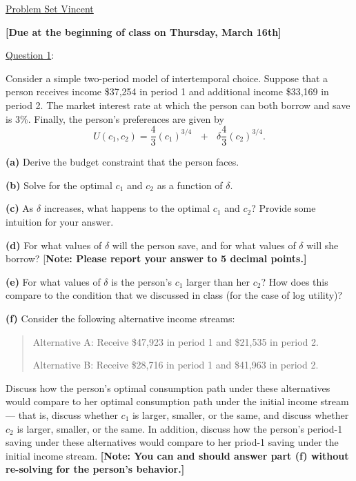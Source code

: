 \documentclass[12pt]{article}
\theoremstyle{definition}
\begin{document}
	
	
	\begin{center}
		\underline{{\Large Problem Set Vincent}}
		
		\textbf{[Due at the beginning of class on Thursday, March 16th]}
	\end{center}
\bigskip

\underline{Question 1}:

Consider a simple two-period model of intertemporal choice. Suppose that a
person receives income \$37,254 in period 1 and additional income \$33,169
in period 2. The market interest rate at which the person can both borrow
and save is 3\%. Finally, the person's preferences are given by 
\[
U(c_{1},c_{2})=\frac{4}{3}\left( c_{1}\right) ^{3/4}\text{ }+\text{ }\delta 
\frac{4}{3}\left( c_{2}\right) ^{3/4}. 
\]

\textbf{(a)} Derive the budget constraint that the person faces.

\textbf{(b)} Solve for the optimal $c_{1}$ and $c_{2}$ as a function of $%
\delta $.

\textbf{(c)} As $\delta $ increases, what happens to the optimal $c_{1}$ and 
$c_{2}$? Provide some intuition for your answer.

\textbf{(d)} For what values of $\delta $ will the person save, and for what
values of $\delta $ will she borrow?\newline
[\textbf{Note: Please report your answer to 5 decimal points.]}

\textbf{(e)} For what values of $\delta $ is the person's $c_{1}$ larger
than her $c_{2}$? How does this compare to the condition that we discussed
in class (for the case of log utility)?

\textbf{(f)} Consider the following alternative income streams:

\begin{quotation}
	Alternative A: Receive \$47,923 in period 1 and \$21,535 in period 2.
	
	Alternative B: Receive \$28,716 in period 1 and \$41,963 in period 2.
\end{quotation}

Discuss how the person's optimal consumption path under these alternatives
would compare to her optimal consumption path under the initial income
stream --- that is, discuss whether $c_{1}$ is larger, smaller, or the same,
and discuss whether $c_{2}$ is larger, smaller, or the same. In addition,
discuss how the person's period-1 saving under these alternatives would
compare to her priod-1 saving under the initial income stream. \textbf{%
	[Note: You can and should answer part (f) without re-solving for the
	person's behavior.]}
\end{document}

